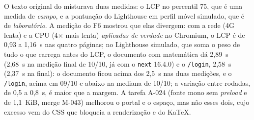 {O texto original do  misturava duas medidas: o LCP no percentil 75, que é uma medida de \emph{campo}, e a pontuação do Lighthouse em perfil móvel simulado, que é de \emph{laboratório}. A medição do F6 mostrou que elas divergem: com a rede (4G lenta) e a CPU (4$\times$ mais lenta) \emph{aplicadas de verdade} no Chromium, o LCP é de 0,93 a 1,16~s nas quatro páginas; no Lighthouse simulado, que soma o peso de tudo o que carrega antes do LCP, o documento com matemática dá 2,89~s (2,68~s na medição final de 10/10, já com o \texttt{next} 16.4.0) e o \texttt{/login}, 2,58~s (2,37~s na final): o documento ficou acima dos 2,5~s nas duas medições, e o \texttt{/login}, acima em 09/10 e abaixo na mediana de 10/10; a variação entre rodadas, de 0,5 a 0,8~s, é maior que a margem. A tarefa A-024 (fonte mono sem \emph{preload} e  de 1,1~KiB, merge M-043) melhorou o portal e o espaço, mas não esses dois, cujo excesso vem do CSS que bloqueia a renderização e do KaTeX.}
